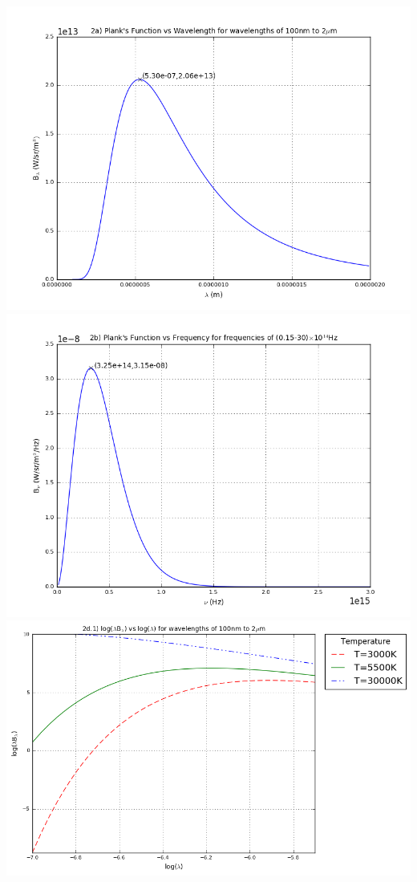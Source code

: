 \documentclass[letter,10pt]{article}
\begin{document}
\includegraphics[scale=0.8]{a2q2a.png}\\
\includegraphics[scale=0.8]{a2q2b.png}\\\includegraphics[scale=0.8]{a2q2d1.png}\\
\end{document}
